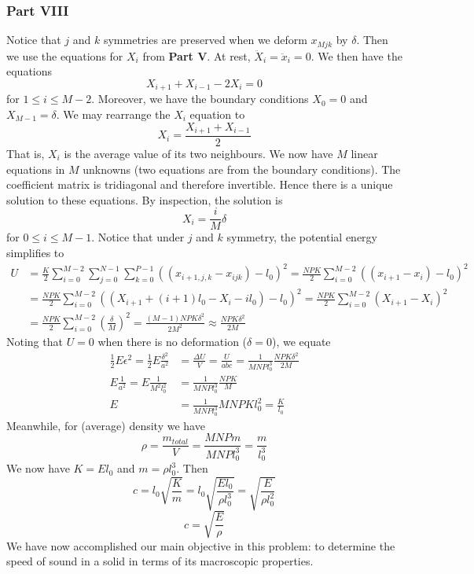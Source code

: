 \documentclass[letterpaper,12pt]{article}
\begin{document}
\begin{flushleft}
    \subsubsection*{Part VIII}
    Notice that $j$ and $k$ symmetries are preserved when we deform $x_{Mjk}$ by $\delta$. Then we use the equations for $X_i$ from \textbf{Part V}. At rest, $\ddot{X}_i = \ddot{x}_i = 0$. We then have the equations
    $$X_{i+1} + X_{i-1} - 2X_i = 0$$
    for $1 \leq i \leq M-2$. Moreover, we have the boundary conditions $X_0 = 0$ and $X_{M-1} = \delta$. We may rearrange the $X_i$ equation to
    $$X_i = \frac{X_{i+1} + X_{i-1}}{2}$$
    That is, $X_i$ is the average value of its two neighbours. We now have $M$ linear equations in $M$ unknowns (two equations are from the boundary conditions). The coefficient matrix is tridiagonal and therefore invertible. Hence there is a unique solution to these equations. By inspection, the solution is
    $$X_i = \frac{i}{M} \delta$$
    for $0 \leq i \leq M-1$. Notice that under $j$ and $k$ symmetry, the potential energy simplifies to
    \begin{align*}
        U &= \frac{K}{2}\sum_{i=0}^{M-2}\sum_{j=0}^{N-1}\sum_{k=0}^{P-1}\left((x_{i+1,j,k} - x_{ijk}) - l_0\right)^2 = \frac{NPK}{2}\sum_{i=0}^{M-2}\left((x_{i+1} - x_{i}) - l_0\right)^2 \\
        &= \frac{NPK}{2}\sum_{i=0}^{M-2}\left((X_{i+1} + (i+1)l_0 - X_{i} - il_0) - l_0\right)^2 = \frac{NPK}{2}\sum_{i=0}^{M-2}\left(X_{i+1} - X_{i}\right)^2 \\
        &= \frac{NPK}{2}\sum_{i=0}^{M-2}\left(\frac{\delta}{M}\right)^2 = \frac{(M-1)NPK\delta^2}{2M^2} \approx \frac{NPK\delta^2}{2M}
    \end{align*}
    Noting that $U = 0$ when there is no deformation ($\delta = 0$), we equate
    \begin{align*}
        \frac{1}{2}E\epsilon^2 = \frac{1}{2}E\frac{\delta^2}{a^2} &= \frac{\Delta U}{V} = \frac{U}{abc} = \frac{1}{MNPl_0^3} \frac{NPK\delta^2}{2M} \\
        E\frac{1}{a^2} = E\frac{1}{M^2l_0^2} &= \frac{1}{MNPl_0^3} \frac{NPK}{M} \\
        E &= \frac{1}{MNPl_0^3} MNPKl_0^2 = \frac{K}{l_0}
    \end{align*}
    Meanwhile, for (average) density we have
    $$\rho = \frac{m_{total}}{V} = \frac{MNPm}{MNPl_0^3} = \frac{m}{l_0^3}$$
    We now have $K = El_0$ and $m = \rho l_0^3$. Then
    $$c = l_0\sqrt{\frac{K}{m}} = l_0\sqrt{\frac{El_0}{\rho l_0^3}} = \sqrt{\frac{E}{\rho l_0^2}}$$
    $$\boxed{c = \sqrt{\frac{E}{\rho}}}$$
    We have now accomplished our main objective in this problem: to determine the speed of sound in a solid in terms of its macroscopic properties.


\end{flushleft}
\end{document}
